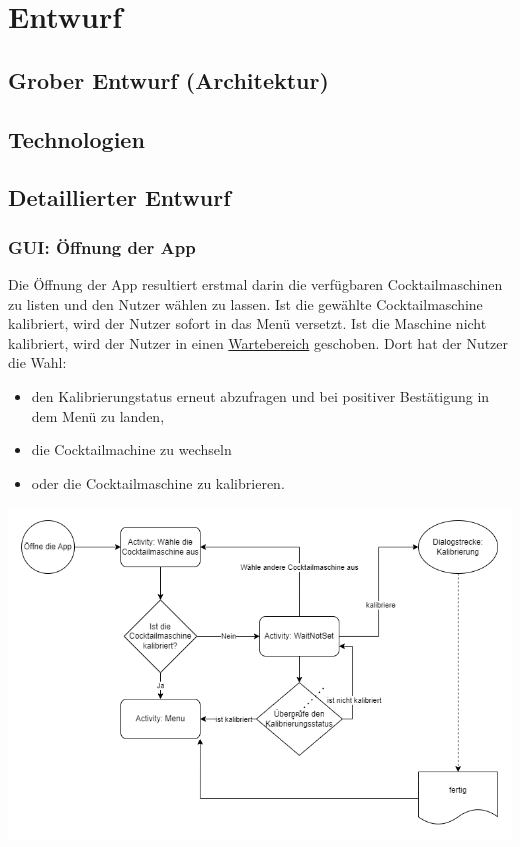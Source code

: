 
\newpage

\chapter{Entwurf} %
\label{cha:entwurf}

\section{Grober Entwurf (Architektur)}
\label{sec:grober_entwurf}

\section{Technologien}
\label{sec:technologien}

\section{Detaillierter Entwurf}
\label{sec:detaillierter_entwurf}

\subsection{GUI: Öffnung der App}
Die Öffnung der App resultiert erstmal darin die verfügbaren Cocktailmaschinen zu listen und den Nutzer wählen zu lassen. Ist die gewählte Cocktailmaschine kalibriert, wird der Nutzer sofort in das Menü versetzt. Ist die Maschine nicht kalibriert, wird der Nutzer in einen \hyperref[subsec:nocal]{Wartebereich} geschoben. Dort hat der Nutzer die Wahl:
\begin{itemize}
	\item den Kalibrierungstatus erneut abzufragen und bei positiver Bestätigung in dem Menü zu landen, 
	\item die Cocktailmachine zu wechseln
	\item oder die Cocktailmaschine zu kalibrieren.
\end{itemize}
\includegraphics[scale=0.40]{Appstart.png}


